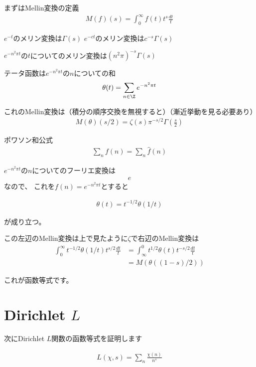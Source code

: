 \documentclass[uplatex, a4paper]{jsbook}
\begin{document}
まずはMellin変換の定義
\begin{align*}
M(f)(s)=\int^\infty_0f(t)t^{s}\frac{dt}{t}
\end{align*}

\begin{eg}
$e^{-t}$のメリン変換は$\Gamma(s)$
$e^{-ct}$のメリン変換は$c^{-s}\Gamma(s)$

$e^{-n^2\pi t}$の$t$についてのメリン変換は$(n^2\pi)^{-s}\Gamma(s)$
\end{eg}

\begin{dfn}
テータ函数は$e^{-n^2\pi t}$の$n$についての和
\begin{align*}
\theta(t)=\sum_{n\in \Z}e^{-n^2\pi t}
\end{align*}
\end{dfn}

これのMellin変換は（積分の順序交換を無視すると）（漸近挙動を見る必要あり）
\begin{align*}
M(\theta)(s/2)=\zeta(s)\pi^{-s/2}\Gamma(\frac{s}{2})
\end{align*}

ポワソン和公式
\begin{align*}
\sum_nf(n)=\sum_n\hat{f}(n)
\end{align*}

$e^{-n^2\pi t}$の$n$についてのフーリエ変換は
\begin{align*}
e
\end{align*}
なので、
これを$f(n)=e^{-n^2\pi t}$とすると

\begin{align*}
\theta(t)=t^{-1/2}\theta(1/t)
\end{align*}

が成り立つ。

この左辺のMellin変換は上で見たように$\zeta$で右辺のMellin変換は
\begin{align*}
\int^\infty_0t^{-1/2}\theta(1/t)t^{s/2}\frac{dt}{t}
&=\int^0_\infty t^{1/2}\theta(t)t^{-s/2}\frac{dt}{t}\\
&=M(\theta((1-s)/2))
\end{align*}

これが函数等式です。

\section{Dirichlet $L$}
次にDirichlet $L$関数の函数等式を証明します

\begin{align*}
L(\chi,s)=\sum_n\frac{\chi(n)}{n^s}
\end{align*}
\end{document}
